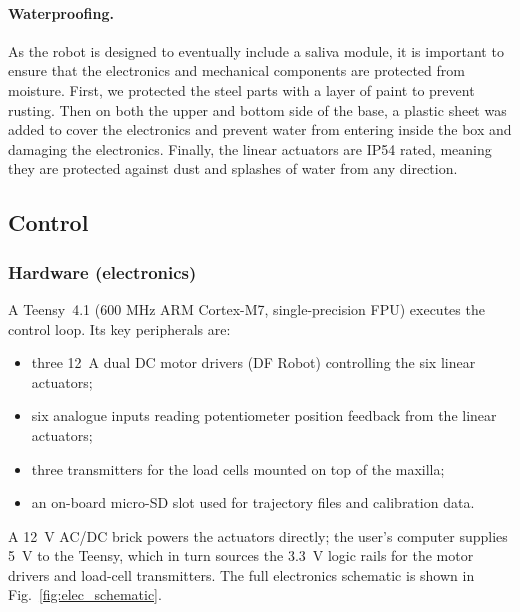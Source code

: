 \paragraph{Waterproofing.}
As the robot is designed to eventually include a saliva module, it is important to ensure that the electronics and mechanical components are protected from moisture.
First, we protected the steel parts with a layer of paint to prevent rusting. Then on both the upper and bottom side of the base, a plastic sheet was added 
to cover the electronics and prevent water from entering inside the box and damaging the electronics. 
Finally, the linear actuators are IP54 rated, meaning they are protected against dust and splashes of water from any direction.

\subsection{Control}


\subsubsection{Hardware (electronics)}
A Teensy~4.1 (600 MHz ARM Cortex-M7, single-precision FPU) executes the control loop.%
Its key peripherals are:  
\begin{itemize}[nosep]
    \item three \SI{12}{\ampere} dual DC motor drivers (DF Robot) controlling the six linear actuators;
    \item six analogue inputs reading potentiometer position feedback from the linear actuators;
    \item three transmitters for the load cells mounted on top of the maxilla;
    \item an on-board micro-SD slot used for trajectory files and calibration data.
\end{itemize}
A \SI{12}{\volt} AC/DC brick powers the actuators directly; the user's computer supplies \SI{5}{\volt} to the Teensy, which in 
turn sources the \SI{3.3}{\volt} logic rails for the motor drivers and load-cell transmitters.
The full electronics schematic is shown in Fig.~\ref{fig:elec_schematic}.

